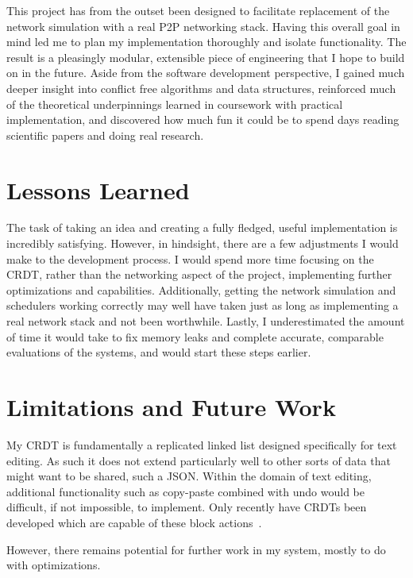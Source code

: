 \documentclass[12pt,a4paper,twoside,openright]{report}
\begin{document}
This project has from the outset been designed to facilitate replacement of the network simulation with a real P2P networking stack. Having this overall goal in mind led me to plan my implementation thoroughly and isolate functionality. The result is a pleasingly modular, extensible piece of engineering that I hope to build on in the future. Aside from the software development perspective, I gained much deeper insight into conflict free algorithms and data structures, reinforced much of the theoretical underpinnings learned in coursework with practical implementation, and discovered how much fun it could be to spend days reading scientific papers and doing real research.

\section{Lessons Learned}
The task of taking an idea and creating a fully fledged, useful implementation is incredibly satisfying. However, in hindsight, there are a few adjustments I would make to the development process. I would spend more time focusing on the CRDT, rather than the networking aspect of the project, implementing further optimizations and capabilities. Additionally, getting the network simulation and schedulers working correctly may well have taken just as long as implementing a real network stack and not been worthwhile. Lastly, I underestimated the amount of time it would take to fix memory leaks and complete accurate, comparable evaluations of the systems, and would start these steps earlier.


\section{Limitations and Future Work} \label{sec:futurework}

My CRDT is fundamentally a replicated linked list designed specifically for text editing. As such it does not extend particularly well to other sorts of data that might want to be shared, such a JSON. Within the domain of text editing, additional functionality such as copy-paste combined with undo would be difficult, if not impossible, to implement. Only recently have CRDTs been developed which are capable of these block actions~\cite{yu2015crdt}.

However, there remains potential for further work in my system, mostly to do with optimizations.
\end{document}
